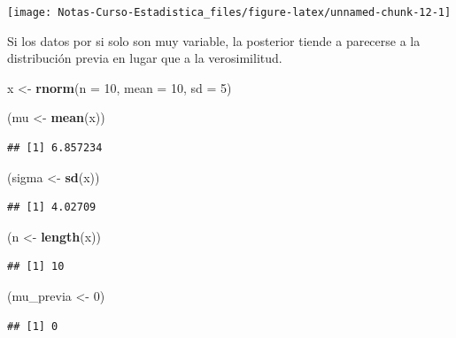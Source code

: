 \documentclass[
  12pt,
]{book}
\newenvironment{Shaded}{\begin{snugshade}}{\end{snugshade}}
\newcommand{\DataTypeTok}[1]{\textcolor[rgb]{0.13,0.29,0.53}{#1}}
\newcommand{\DecValTok}[1]{\textcolor[rgb]{0.00,0.00,0.81}{#1}}
\newcommand{\KeywordTok}[1]{\textcolor[rgb]{0.13,0.29,0.53}{\textbf{#1}}}
\newcommand{\NormalTok}[1]{#1}
\newcommand{\StringTok}[1]{\textcolor[rgb]{0.31,0.60,0.02}{#1}}
\begin{document}
\begin{center}\texttt{[image: Notas-Curso-Estadistica\_files/figure-latex/unnamed-chunk-12-1]} \end{center}

Si los datos por si solo son muy variable, la posterior tiende a parecerse a la
distribución previa en lugar que a la verosimilitud.

\begin{Shaded}
\begin{Highlighting}[]
\NormalTok{x \textless{}{-}}\StringTok{ }\KeywordTok{rnorm}\NormalTok{(}\DataTypeTok{n =} \DecValTok{10}\NormalTok{, }\DataTypeTok{mean =} \DecValTok{10}\NormalTok{, }\DataTypeTok{sd =} \DecValTok{5}\NormalTok{)}

\NormalTok{(mu \textless{}{-}}\StringTok{ }\KeywordTok{mean}\NormalTok{(x))}
\end{Highlighting}
\end{Shaded}

\begin{verbatim}
## [1] 6.857234
\end{verbatim}

\begin{Shaded}
\begin{Highlighting}[]
\NormalTok{(sigma \textless{}{-}}\StringTok{ }\KeywordTok{sd}\NormalTok{(x))}
\end{Highlighting}
\end{Shaded}

\begin{verbatim}
## [1] 4.02709
\end{verbatim}

\begin{Shaded}
\begin{Highlighting}[]
\NormalTok{(n \textless{}{-}}\StringTok{ }\KeywordTok{length}\NormalTok{(x))}
\end{Highlighting}
\end{Shaded}

\begin{verbatim}
## [1] 10
\end{verbatim}

\begin{Shaded}
\begin{Highlighting}[]
\NormalTok{(mu\_previa \textless{}{-}}\StringTok{ }\DecValTok{0}\NormalTok{)}
\end{Highlighting}
\end{Shaded}

\begin{verbatim}
## [1] 0
\end{verbatim}
\end{document}
